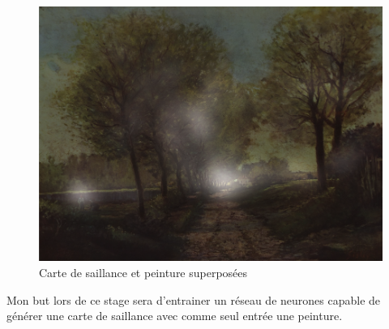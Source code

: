 \begin{figure}[!ht]
    \centering
    \includegraphics[width=0.7\linewidth]{datas/exemple_saliency_map_transparency.png}
    \caption{Carte de saillance et peinture superposées}
    \label{saliency_map_transparency}
\end{figure}

\par
Mon but lors de ce stage sera d'entrainer un réseau de neurones capable de générer une carte de saillance avec comme seul entrée une peinture. 